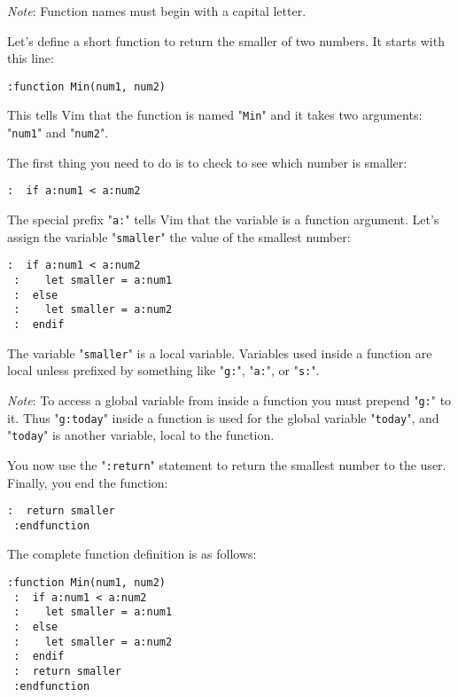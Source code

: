 \emph{Note}:
Function names must begin with a capital letter.

Let's define a short function to return the smaller of two numbers.
It starts with this line:

\begin{Verbatim}[samepage=true]
 :function Min(num1, num2)
\end{Verbatim}

This tells Vim that the function is named "\verb!Min!" and it takes two arguments: "\verb!num1!" and "\verb!num2!".

The first thing you need to do is to check to see which number is smaller:

\begin{Verbatim}[samepage=true]
 :  if a:num1 < a:num2
\end{Verbatim}

The special prefix "\verb!a:!" tells Vim that the variable is a function argument.
Let's assign the variable "\verb!smaller!" the value of the smallest number:

\begin{Verbatim}[samepage=true]
 :  if a:num1 < a:num2
 :    let smaller = a:num1
 :  else
 :    let smaller = a:num2
 :  endif
\end{Verbatim}

The variable "\verb!smaller!" is a local variable.
Variables used inside a function are local unless prefixed by something like "\verb!g:!", "\verb!a:!", or "\verb!s:!".

\emph{Note}:
To access a global variable from inside a function you must prepend "\verb!g:!" to it.
Thus "\verb!g:today!" inside a function is used for the global variable "\verb!today!", and "\verb!today!" is another variable, local to the function.

You now use the "\verb!:return!" statement to return the smallest number to the user.
Finally, you end the function:

\begin{Verbatim}[samepage=true]
 :  return smaller
 :endfunction
\end{Verbatim}

The complete function definition is as follows:

\begin{Verbatim}[samepage=true]
 :function Min(num1, num2)
 :  if a:num1 < a:num2
 :    let smaller = a:num1
 :  else
 :    let smaller = a:num2
 :  endif
 :  return smaller
 :endfunction
\end{Verbatim}

